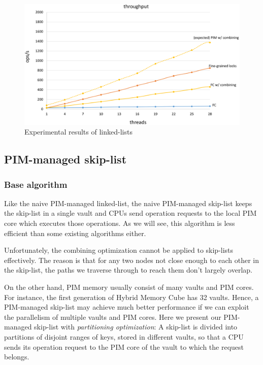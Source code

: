 \documentclass[11pt]{article}
\begin{document}
\begin{figure}[ht!]
\centering
\includegraphics[width=.8\linewidth]{linkedlist_data.eps}
\caption{Experimental results of linked-lists}
\label{figure:linkedlist_data}
\end{figure}

\subsection{PIM-managed skip-list}
\label{section:skip_list}

\subsubsection{Base algorithm}
Like the naive PIM-managed linked-list,
the naive PIM-managed skip-list keeps the skip-list in a single vault and
CPUs send operation requests to the local PIM core which executes those operations.
As we will see, this algorithm is less efficient than some existing algorithms either.

Unfortunately, the combining optimization cannot be applied to skip-lists effectively.
The reason is that for any two nodes not close enough to each other in the skip-list,
the paths we traverse through to reach them don't largely overlap.

On the other hand, PIM memory usually consist of many vaults and PIM cores.
For instance, the first generation of Hybrid Memory Cube \cite{website:HMC} has 32 vaults.
Hence, a PIM-managed skip-list may achieve much better performance if
we can exploit the parallelism of multiple vaults and PIM cores.
Here we present our PIM-managed skip-list with \emph{partitioning optimization}:
A skip-list is divided into partitions of disjoint ranges of keys,
stored in different vaults, so that a CPU sends its operation request to
the PIM core of the vault to which the request belongs.
\end{document}
